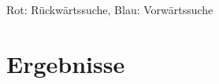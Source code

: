\begin{frame}{\insertsection}
  \begin{figure}[!b]
    \centering
    
  \end{figure}

  {\color{red} Rot: Rückwärtssuche},
  {\color{blue} Blau: Vorwärtssuche}
\end{frame}


\section{Ergebnisse}
\sectionframe{\insertsection}

\begin{frame}{\insertsection}

\end{frame}

